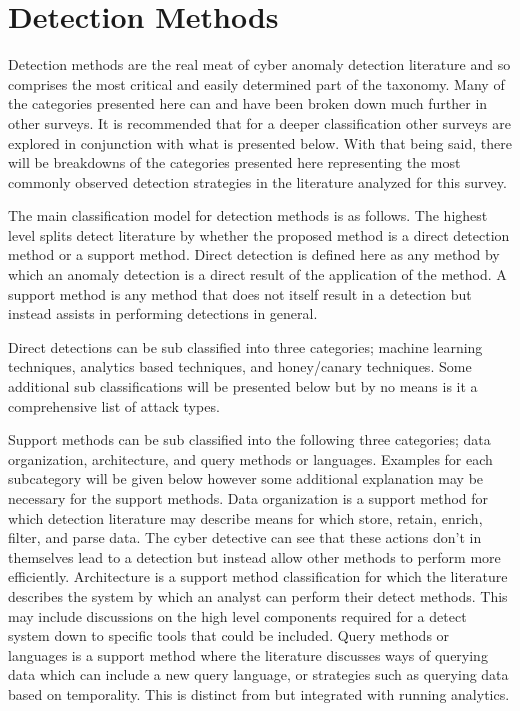 \section{Detection Methods}
Detection methods are the real meat of cyber anomaly detection literature and so comprises the most critical and easily determined part of the taxonomy. 
Many of the categories presented here can and have been broken down much further in other surveys. 
It is recommended that for a deeper classification other surveys are explored in conjunction with what is presented below. 
With that being said, there will be breakdowns of the categories presented here representing the most commonly observed detection strategies in the literature analyzed for this survey.

The main classification model for detection methods is as follows. 
The highest level splits detect literature by whether the proposed method is a direct detection method or a support method. 
Direct detection is defined here as any method by which an anomaly detection is a direct result of the application of the method. 
A support method is any method that does not itself result in a detection but instead assists in performing detections in general.

Direct detections can be sub classified into three categories; machine learning techniques, analytics based techniques, and honey/canary techniques. 
Some additional sub classifications will be presented below but by no means is it a comprehensive list of attack types. 

Support methods can be sub classified into the following three categories; data organization, architecture, and query methods or languages. 
Examples for each subcategory will be given below however some additional explanation may be necessary for the support methods. 
Data organization is a support method for which detection literature may describe means for which store, retain, enrich, filter, and parse data. 
The cyber detective can see that these actions don't in themselves lead to a detection but instead allow other methods to perform more efficiently. 
Architecture is a support method classification for which the literature describes the system by which an analyst can perform their detect methods. 
This may include discussions on the high level components required for a detect system down to specific tools that could be included. 
Query methods or languages is a support method where the literature discusses ways of querying data which can include a new query language, or strategies such as querying data based on temporality. 
This is distinct from but integrated with running analytics.

